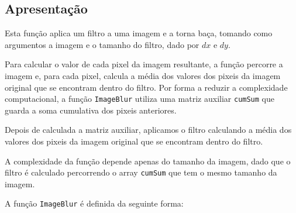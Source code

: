 \documentclass{report}
\begin{document}
\subsection{Apresentação}
Esta função aplica um filtro a uma imagem e a torna baça, tomando como argumentos a imagem e o tamanho do filtro, dado por \(dx\) e \(dy\).
\par
Para calcular o valor de cada pixel da imagem resultante, a função percorre a imagem e, para cada pixel,
calcula a média dos valores dos pixeis da imagem original que se encontram dentro do filtro. Por forma a reduzir a complexidade computacional,
a função \texttt{ImageBlur} utiliza uma matriz auxiliar \texttt{cumSum} que guarda a soma cumulativa dos pixeis anteriores.
\par
Depois de calculada a matriz auxiliar, aplicamos o filtro calculando a média dos valores dos pixeis da imagem original que se encontram dentro do filtro.
\par
A complexidade da função depende apenas do tamanho da imagem, dado que o filtro é calculado percorrendo o array \texttt{cumSum} 
que tem o mesmo tamanho da imagem.
\par
A função \texttt{ImageBlur} é definida da seguinte forma:
\end{document}
